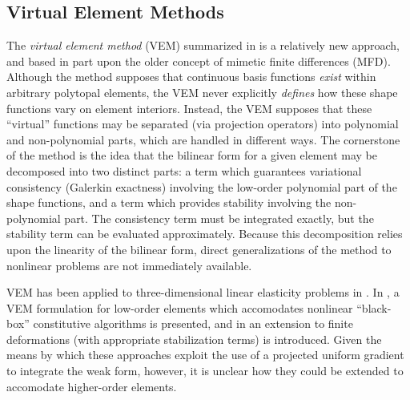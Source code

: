 	\subsection*{Virtual Element Methods}
		The \textit{virtual element method} (VEM) summarized in \cite{Veiga:13} is a relatively new approach, and based in part upon the older concept of mimetic finite differences (MFD). Although the method supposes that continuous basis functions \textit{exist} within arbitrary polytopal elements, the VEM never explicitly \textit{defines} how these shape functions vary on element interiors. Instead, the VEM supposes that these ``virtual'' functions may be separated (via projection operators) into polynomial and non-polynomial parts, which are handled in different ways. The cornerstone of the method is the idea that the bilinear form for a given element may be decomposed into two distinct parts: a term which guarantees variational consistency (Galerkin exactness) involving the low-order polynomial part of the shape functions, and a term which provides stability involving the non-polynomial part. The consistency term must be integrated exactly, but the stability term can be evaluated approximately. Because this decomposition relies upon the linearity of the bilinear form, direct generalizations of the method to nonlinear problems are not immediately available.
		
		VEM has been applied to three-dimensional linear elasticity problems in \cite{Gain:13}. In \cite{Veiga:15}, a VEM formulation for low-order elements which accomodates nonlinear ``black-box'' constitutive algorithms is presented, and in \cite{Chi:17} an extension to finite deformations (with appropriate stabilization terms) is introduced. Given the means by which these approaches exploit the use of a projected uniform gradient to integrate the weak form, however, it is unclear how they could be extended to accomodate higher-order elements.
		
